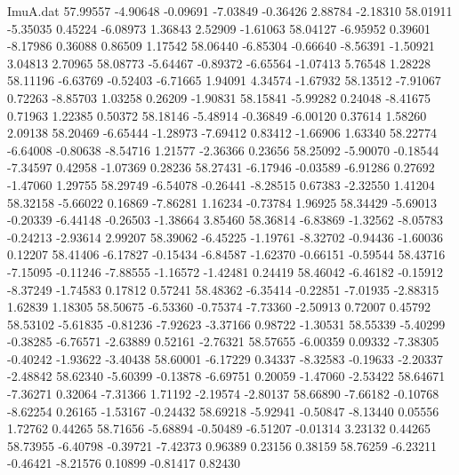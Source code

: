 \begin{filecontents}{ImuA.dat}
  57.99557   -4.90648   -0.09691   -7.03849   -0.36426    2.88784   -2.18310
  58.01911   -5.35035    0.45224   -6.08973    1.36843    2.52909   -1.61063
  58.04127   -6.95952    0.39601   -8.17986    0.36088    0.86509    1.17542
  58.06440   -6.85304   -0.66640   -8.56391   -1.50921    3.04813    2.70965
  58.08773   -5.64467   -0.89372   -6.65564   -1.07413    5.76548    1.28228
  58.11196   -6.63769   -0.52403   -6.71665    1.94091    4.34574   -1.67932
  58.13512   -7.91067    0.72263   -8.85703    1.03258    0.26209   -1.90831
  58.15841   -5.99282    0.24048   -8.41675    0.71963    1.22385    0.50372
  58.18146   -5.48914   -0.36849   -6.00120    0.37614    1.58260    2.09138
  58.20469   -6.65444   -1.28973   -7.69412    0.83412   -1.66906    1.63340
  58.22774   -6.64008   -0.80638   -8.54716    1.21577   -2.36366    0.23656
  58.25092   -5.90070   -0.18544   -7.34597    0.42958   -1.07369    0.28236
  58.27431   -6.17946   -0.03589   -6.91286    0.27692   -1.47060    1.29755
  58.29749   -6.54078   -0.26441   -8.28515    0.67383   -2.32550    1.41204
  58.32158   -5.66022    0.16869   -7.86281    1.16234   -0.73784    1.96925
  58.34429   -5.69013   -0.20339   -6.44148   -0.26503   -1.38664    3.85460
  58.36814   -6.83869   -1.32562   -8.05783   -0.24213   -2.93614    2.99207
  58.39062   -6.45225   -1.19761   -8.32702   -0.94436   -1.60036    0.12207
  58.41406   -6.17827   -0.15434   -6.84587   -1.62370   -0.66151   -0.59544
  58.43716   -7.15095   -0.11246   -7.88555   -1.16572   -1.42481    0.24419
  58.46042   -6.46182   -0.15912   -8.37249   -1.74583    0.17812    0.57241
  58.48362   -6.35414   -0.22851   -7.01935   -2.88315    1.62839    1.18305
  58.50675   -6.53360   -0.75374   -7.73360   -2.50913    0.72007    0.45792
  58.53102   -5.61835   -0.81236   -7.92623   -3.37166    0.98722   -1.30531
  58.55339   -5.40299   -0.38285   -6.76571   -2.63889    0.52161   -2.76321
  58.57655   -6.00359    0.09332   -7.38305   -0.40242   -1.93622   -3.40438
  58.60001   -6.17229    0.34337   -8.32583   -0.19633   -2.20337   -2.48842
  58.62340   -5.60399   -0.13878   -6.69751    0.20059   -1.47060   -2.53422
  58.64671   -7.36271    0.32064   -7.31366    1.71192   -2.19574   -2.80137
  58.66890   -7.66182   -0.10768   -8.62254    0.26165   -1.53167   -0.24432
  58.69218   -5.92941   -0.50847   -8.13440    0.05556    1.72762    0.44265
  58.71656   -5.68894   -0.50489   -6.51207   -0.01314    3.23132    0.44265
  58.73955   -6.40798   -0.39721   -7.42373    0.96389    0.23156    0.38159
  58.76259   -6.23211   -0.46421   -8.21576    0.10899   -0.81417    0.82430

\end{filecontents}
